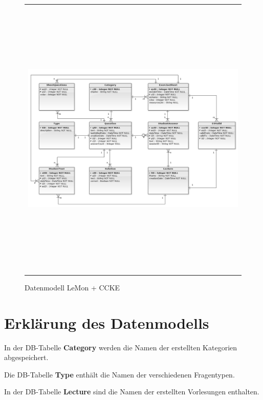 \begin{landscape}
\begin{figure} [!htb]
	\begin{center}
		  \begin{tabular}{@{}r@{}}
			{\includegraphics[height=37em]{images/Entityrelationshipdiagram.png}}\\
 	 	 \end{tabular}
		\caption{Datenmodell LeMon + CCKE}
		\label{fig:Datenmodell}
	\end{center} 
\end{figure}

\end{landscape}




\section{Erklärung des Datenmodells}

In der DB-Tabelle \textbf{Category} werden die Namen der erstellten Kategorien
abgespeichert.

Die DB-Tabelle \textbf{Type} enthält die Namen der verschiedenen Fragentypen.

In der DB-Tabelle \textbf{Lecture} sind die Namen der erstellten Vorlesungen
enthalten.

